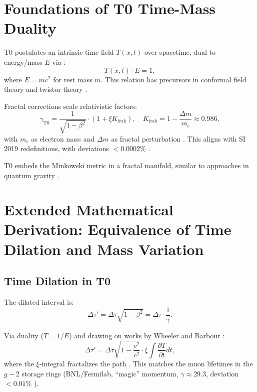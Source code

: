 	\section{Foundations of T0 Time-Mass Duality}
	T0 postulates an intrinsic time field $T(x,t)$ over spacetime, dual to energy/mass $E$ via \cite{pascher2025qm, penrose2004}:
	\begin{equation}
		T(x,t) \cdot E = 1,
	\end{equation}
	where $E = m c^2$ for rest mass $m$. This relation has precursors in conformal field theory \cite{francesco1997} and twistor theory \cite{penrose1967}.
	
	Fractal corrections scale relativistic factors:
	\begin{equation}
		\gamma_\text{T0} = \frac{1}{\sqrt{1 - \beta^2}} \cdot (1 + \xi K_\text{frak}), \quad K_\text{frak} = 1 - \frac{\Delta m}{m_e} \approx 0.986,
	\end{equation}
	with $m_e$ as electron mass and $\Delta m$ as fractal perturbation \cite{pascher2025si}. This aligns with SI 2019 redefinitions, with deviations $<0.0002\%$ \cite{codata2019, newell2018}.
	
	T0 embeds the Minkowski metric in a fractal manifold, similar to approaches in quantum gravity \cite{rovelli2004, thiemann2007}.
	
	\section{Extended Mathematical Derivation: Equivalence of Time Dilation and Mass Variation}
	
	\subsection{Time Dilation in T0}
	The dilated interval is:
	\begin{equation}
		\Delta \tau' = \Delta \tau \sqrt{1 - \beta^2} = \Delta \tau \cdot \frac{1}{\gamma}.
	\end{equation}
	
	Via duality ($T = 1/E$) and drawing on works by Wheeler \cite{wheeler1990} and Barbour \cite{barbour1999}:
	\begin{equation}
		\Delta \tau' = \Delta \tau \sqrt{1 - \frac{v^2}{c^2}} \cdot \xi \int \frac{\partial T}{\partial t} dt,
	\end{equation}
	where the $\xi$-integral fractalizes the path \cite{pascher2025qm}. This matches the muon lifetimes in the $g-2$ storage rings (BNL/Fermilab, \enquote{magic} momentum, $\gamma \approx 29.3$, deviation $<0.01\%$ \cite{pdg2024, atlas2023}).
	
